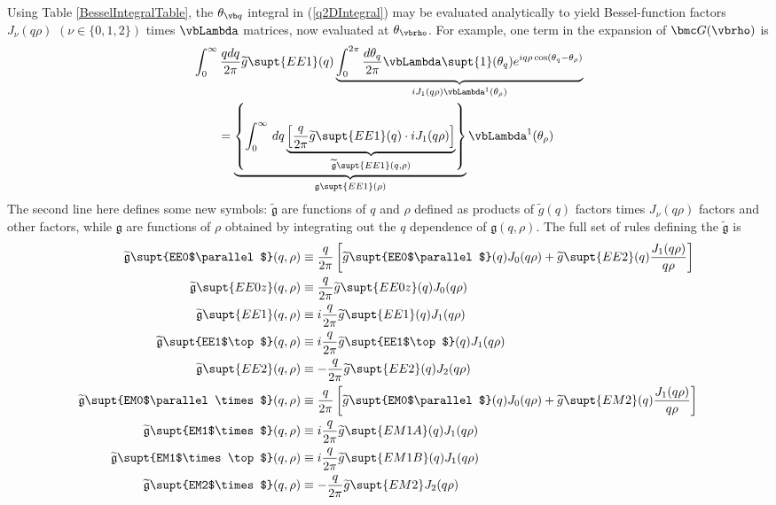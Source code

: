 \documentclass[letterpaper]{article}
\renewcommand{\wt}{\widetilde}
\begin{document}
Using Table \ref{BesselIntegralTable}, the $\theta_{\vb q}$ integral
in (\ref{q2DIntegral}) may be evaluated analytically to yield
Bessel-function factors $J_\nu(q\rho)$ $(\nu\in\{0,1,2\})$
times $\vbLambda$ matrices, now evaluated at $\theta_{\vbrho}$. For
example, one term in the expansion of $\bmc G(\vbrho)$ is
\begin{align*}
& \int_0^\infty \frac{q dq}{2\pi} \wt{g}\supt{EE1}(q)
  \underbrace{
  \int_0^{2\pi} \frac{d\theta_q}{2\pi}
                \vbLambda\supt{1}(\theta_q)e^{iq\rho\cos(\theta_q-\theta_\rho)}
             }_{iJ_1(q\rho)\vbLambda^1(\theta_\rho)}
\\
&\qquad= \underbrace{
   \left\{\int_0^\infty \, dq
   \underbrace{
   \left[\frac{q}{2\pi} \wt{g}\supt{EE1}(q)\cdot iJ_1(q\rho)\right]
              }_{\wt{\mathfrak g}\supt{EE1}(q,\rho)}
   \right\}}_{\mathfrak{g}\supt{EE1}(\rho)}
   \vbLambda^1(\theta_\rho)
\end{align*}
The second line here defines some new symbols:
$\wt{\mathfrak{g}}$ are functions of $q$ and $\rho$
defined as products of $\wt{g}(q)$ factors times $J_\nu(q\rho)$
factors and other factors, while $\mathfrak{g}$ are
functions of $\rho$ obtained by integrating out the $q$ dependence
of $\mathfrak{g}(q,\rho)$.
The full set of rules defining the $\wt{\mathfrak{g}}$ is
\begin{subequations}
\begin{align}
  \wt{\mathfrak{g}}\supt{EE0$\parallel$}(q,\rho)
&\equiv\frac{q}{2\pi}\left[    \wt{g}\supt{EE0$\parallel$}(q) J_0(q\rho)
                       +  \wt{g}\supt{EE2}(q) \frac{J_1(q\rho)}{q\rho}
               \right]
\\
  \wt{\mathfrak{g}}\supt{EE0z}(q,\rho)
&\equiv\frac{q}{2\pi}\wt{g}\supt{EE0z}(q) J_0(q\rho)
\\
  \wt{\mathfrak{g}}\supt{EE1}(q,\rho)
&\equiv i\frac{q}{2\pi}\wt{g}\supt{EE1}(q) J_1(q\rho)
\\
  \wt{\mathfrak{g}}\supt{EE1$\top$}(q,\rho)
&\equiv i\frac{q}{2\pi}\wt{g}\supt{EE1$\top$}(q) J_1(q\rho)
\\
  \wt{\mathfrak{g}}\supt{EE2}(q,\rho)
&\equiv-\frac{q}{2\pi}\wt{g}\supt{EE2}(q) J_2(q\rho)
\\
  \wt{\mathfrak{g}}\supt{EM0$\parallel \times$}(q,\rho)
&\equiv\frac{q}{2\pi}\left[    \wt{g}\supt{EM0$\parallel$}(q) J_0(q\rho)
                       +  \wt{g}\supt{EM2}(q) \frac{J_1(q\rho)}{q\rho}
                 \right]
\\
  \wt{\mathfrak{g}}\supt{EM1$\times$}(q,\rho)
&\equiv i\frac{q}{2\pi}\wt{g}\supt{EM1A}(q) J_1(q\rho)
\\
  \wt{\mathfrak{g}}\supt{EM1$\times\top$}(q,\rho)
&\equiv i\frac{q}{2\pi}\wt{g}\supt{EM1B}(q) J_1(q\rho)
\\
  \wt{\mathfrak{g}}\supt{EM2$\times$}(q,\rho)
&\equiv-\frac{q}{2\pi}\wt{g}\supt{EM2}J_2(q\rho)
\end{align}
\label{wtgFrakDef}%
\end{subequations}
\end{document}
